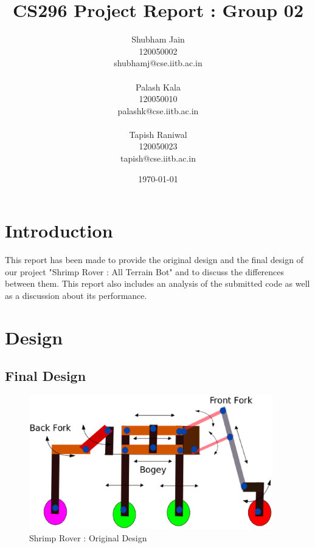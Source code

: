 \documentclass[english, 11pt]{article}
\begin{document}
\title{CS296 Project Report : Group 02}

\author{Shubham Jain\\ %
	120050002\\
	shubhamj@cse.iitb.ac.in\\
	\\	
	Palash Kala\\
	120050010\\
	palashk@cse.iitb.ac.in\\
	\\
	Tapish Raniwal\\
	120050023\\
	tapish@cse.iitb.ac.in\\}

\date{\today}

\maketitle %

\section{Introduction}

This report has been made to provide the original design and the final design of our project "Shrimp Rover : All Terrain Bot" 
and to discuss the differences between them. This report also includes an analysis of the submitted code as well as a 
discussion about its performance.

\section{Design}

\subsection{Final Design}
\begin{figure}
	\begin{center}
		\includegraphics[width=400px]{drawing}
	\end{center}
	\caption{Shrimp Rover : Original Design}
\end{figure}
\end{document}

